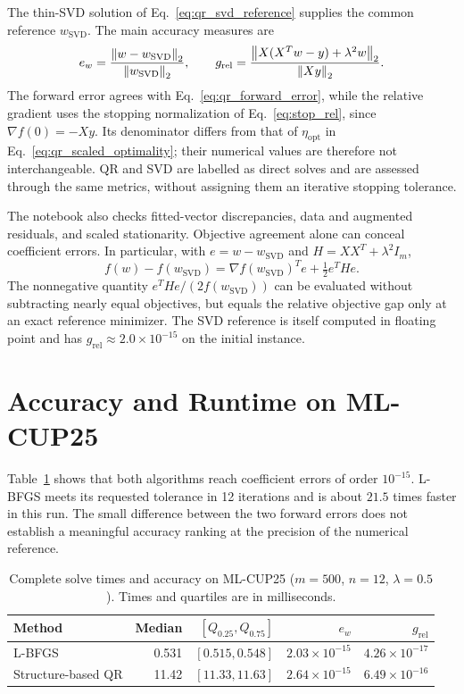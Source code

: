 \noindent The thin-SVD solution of Eq.~\eqref{eq:qr_svd_reference} supplies
the common reference $w_{\mathrm{SVD}}$. The main accuracy measures are
\begin{equation}
\label{eq:comparison_gradient}
    e_w=\frac{\left\|w-w_{\mathrm{SVD}}\right\|_2}{\left\|w_{\mathrm{SVD}}\right\|_2},
    \qquad
    g_{\mathrm{rel}}=
    \frac{\left\|X(X^Tw-y)+\lambda^2w\right\|_2}{\left\|Xy\right\|_2}.
\end{equation}
The forward error agrees with Eq.~\eqref{eq:qr_forward_error}, while the
relative gradient uses the stopping normalization of
Eq.~\eqref{eq:stop_rel}, since $\nabla f(0)=-Xy$. Its denominator differs
from that of $\eta_{\mathrm{opt}}$ in
Eq.~\eqref{eq:qr_scaled_optimality}; their numerical values are therefore
not interchangeable. QR and SVD are labelled as direct solves and are
assessed through the same metrics, without assigning them an iterative
stopping tolerance.

\noindent The notebook also checks fitted-vector discrepancies, data and
augmented residuals, and scaled stationarity. Objective agreement alone
can conceal coefficient errors. In particular, with
$e=w-w_{\mathrm{SVD}}$ and $H=XX^T+\lambda^2I_m$,
\begin{equation}
\label{eq:comparison_energy}
    f(w)-f(w_{\mathrm{SVD}})
    =\nabla f(w_{\mathrm{SVD}})^Te+\tfrac12e^THe.
\end{equation}
The nonnegative quantity $e^THe/(2f(w_{\mathrm{SVD}}))$ can be evaluated
without subtracting nearly equal objectives, but equals the relative
objective gap only at an exact reference minimizer. The SVD reference is
itself computed in floating point and has
$g_{\mathrm{rel}}\approx2.0\times10^{-15}$ on the initial instance.

\section{Accuracy and Runtime on ML-CUP25}
\label{sec:comparison_baseline}

\noindent Table~\ref{tab:comparison_baseline} shows that both algorithms
reach coefficient errors of order $10^{-15}$. L-BFGS meets its requested
tolerance in 12 iterations and is about $21.5$ times faster in this run.
The small difference between the two forward errors does not establish a
meaningful accuracy ranking at the precision of the numerical reference.

\begin{table}[H]
\centering
\caption{Complete solve times and accuracy on ML-CUP25
($m=500$, $n=12$, $\lambda=0.5$). Times and quartiles are in milliseconds.}
\label{tab:comparison_baseline}
\small
\begin{tabular}{lrrrr}
    \toprule
    \textbf{Method} & \textbf{Median} & $[Q_{0.25},Q_{0.75}]$
        & $e_w$ & $g_{\mathrm{rel}}$ \\
    \midrule
    L-BFGS & 0.531 & $[0.515,0.548]$ & $2.03\times10^{-15}$ & $4.26\times10^{-17}$ \\
    Structure-based QR & 11.42 & $[11.33,11.63]$ & $2.64\times10^{-15}$ & $6.49\times10^{-16}$ \\
    \bottomrule
\end{tabular}
\end{table}

